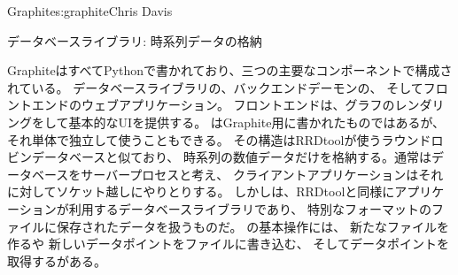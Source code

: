 \begin{aosachapter}{Graphite}{s:graphite}{Chris Davis}
\begin{aosasect1}{データベースライブラリ: 時系列データの格納}

GraphiteはすべてPythonで書かれており、三つの主要なコンポーネントで構成されている。
データベースライブラリの、バックエンドデーモンの、
そしてフロントエンドのウェブアプリケーション。
フロントエンドは、グラフのレンダリングをして基本的なUIを提供する。
はGraphite用に書かれたものではあるが、それ単体で独立して使うこともできる。
その構造はRRDtoolが使うラウンドロビンデータベースと似ており、
時系列の数値データだけを格納する。通常はデータベースをサーバープロセスと考え、
クライアントアプリケーションはそれに対してソケット越しにやりとりする。
しかしは、RRDtoolと同様にアプリケーションが利用するデータベースライブラリであり、
特別なフォーマットのファイルに保存されたデータを扱うものだ。
の基本操作には、
新たなファイルを作るや
新しいデータポイントをファイルに書き込む、
そしてデータポイントを取得するがある。



\end{aosasect1}
\end{aosachapter}
